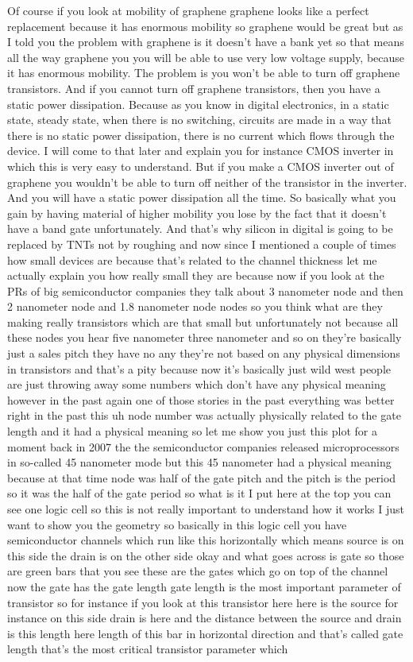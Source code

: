 Of course if you look at mobility of graphene graphene looks like a perfect replacement because it has enormous mobility so graphene would be great but as I told you the problem with graphene is it doesn't have a bank yet so that means all the way graphene you you will be able to use very low voltage supply, because it has enormous mobility. The problem is you won't be able to turn off graphene transistors. And if you cannot turn off graphene transistors, then you have a static power dissipation. Because as you know in digital electronics, in a static state, steady state, when there is no switching, circuits are made in a way that there is no static power dissipation, there is no current which flows through the device. I will come to that later and explain you for instance CMOS inverter in which this is very easy to understand. But if you make a CMOS inverter out of graphene you wouldn't be able to turn off neither of the transistor in the inverter. And you will have a static power dissipation all the time. So basically what you gain by having material of higher mobility you lose by the fact that it doesn't have a band gate unfortunately. And that's why silicon in digital is going to be replaced by TNTs not by roughing and now since I mentioned a couple of times how small devices are because that's related to the channel thickness let me actually explain you how really small they are because now if you look at the PRs of big semiconductor companies they talk about 3 nanometer node and then 2 nanometer node and 1.8 nanometer node nodes so you think what are they making really transistors which are that small but unfortunately not because all these nodes you hear five nanometer three nanometer and so on they're basically just a sales pitch they have no any they're not based on any physical dimensions in transistors and that's a pity because now it's basically just wild west people are just throwing away some numbers which don't have any physical meaning however in the past again one of those stories in the past everything was better right in the past this uh node number was actually physically related to the gate length and it had a physical meaning so let me show you just this plot for a moment back in 2007 the the semiconductor companies released microprocessors in so-called 45 nanometer mode but this 45 nanometer had a physical meaning because at that time node was half of the gate pitch and the pitch is the period so it was the half of the gate period so what is it I put here at the top you can see one logic cell so this is not really important to understand how it works I just want to show you the geometry so basically in this logic cell you have semiconductor channels which run like this horizontally which means source is on this side the drain is on the other side okay and what goes across is gate so those are green bars that you see these are the gates which go on top of the channel now the gate has the gate length gate length is the most important parameter of transistor so for instance if you look at this transistor here here is the source for instance on this side drain is here and the distance between the source and drain is this length here length of this bar in horizontal direction and that's called gate length that's the most critical transistor parameter which 